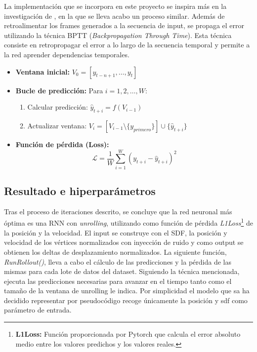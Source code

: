 \begin{itemize}
    La implementación que se incorpora en este proyecto se inspira más en la investigación de \cite{holden_subspace_2019}, en la que se lleva acabo un proceso similar. Además de retroalimentar los frames generados a la secuencia de input, se propaga el error utilizando la técnica BPTT (\textit{Backpropagation Through Time}). Esta técnica consiste en retropropagar el error a lo largo de la secuencia temporal y permite a la red aprender dependencias temporales.
    
    \begin{itemize}
        \item \textbf{Ventana inicial:} $V_0 = [y_{t-n+1}, \dots, y_t]$
        \item \textbf{Bucle de predicción:} Para $i = 1, 2, \dots, W$:
        \begin{enumerate}
            \item Calcular predicción: $\hat{y}_{t+i} = f(V_{i-1})$
            \item Actualizar ventana: $V_i = [V_{i-1} \setminus \{y_{primero}\}] \cup \{\hat{y}_{t+i}\}$
        \end{enumerate}
        \item \textbf{Función de pérdida (Loss):} 
        $$\mathcal{L} = \frac{1}{W} \sum_{i=1}^{W} (y_{t+i} - \hat{y}_{t+i})^2$$
    \end{itemize}

\end{itemize}

\subsection{Resultado e hiperparámetros}

Tras el proceso de iteraciones descrito, se concluye que la red neuronal más óptima es una RNN con \textit{unrolling}, utilizando como función de pérdida \textit{L1Loss}\footnote{\textbf{L1Loss:} Función proporcionada por Pytorch que calcula el error absoluto medio entre los valores predichos y los valores reales.} de la posición y la velocidad. El input se construye con el SDF, la posición y velocidad de los vértices normalizados con inyección de ruido y como output se obtienen los deltas de desplazamiento normalizados.\newline
La siguiente función, \textit{RunRollout()}, lleva a cabo el cálculo de las predicciones y la pérdida de las mismas para cada lote de datos del dataset. Siguiendo la técnica mencionada, ejecuta las predicciones necesarias para avanzar en el tiempo tanto como el tamaño de la ventana de unrolling le indica. Por simplicidad el modelo que sa ha decidido representar por pseudocódigo recoge únicamente la posición y sdf como parámetro de entrada.

